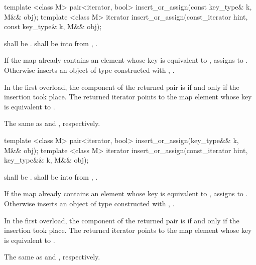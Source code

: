 %
\begin{itemdecl}
template <class M> pair<iterator, bool> insert_or_assign(const key_type& k, M&& obj);
template <class M> iterator insert_or_assign(const_iterator hint, const key_type& k, M&& obj);
\end{itemdecl}

\begin{itemdescr}
\pnum
\requires
{} shall be .
 shall be  into 
from , .

\pnum
\effects
If the map already contains an element 
whose key is equivalent to ,
assigns  to .
Otherwise inserts an object of type 
constructed with , .

\pnum
\returns
In the first overload,
the  component of the returned pair is 
if and only if the insertion took place.
The returned iterator points to the map element
whose key is equivalent to .

\pnum
\complexity
The same as  and ,
respectively.
\end{itemdescr}

%
\begin{itemdecl}
template <class M> pair<iterator, bool> insert_or_assign(key_type&& k, M&& obj);
template <class M> iterator insert_or_assign(const_iterator hint, key_type&& k, M&& obj);
\end{itemdecl}

\begin{itemdescr}
\pnum
\requires
{} shall be .
 shall be  into 
from , .

\pnum
\effects
If the map already contains an element 
whose key is equivalent to ,
assigns  to .
Otherwise inserts an object of type 
constructed with , .

\pnum
\returns
In the first overload,
the  component of the returned pair is 
if and only if the insertion took place.
The returned iterator points to the map element
whose key is equivalent to .

\pnum
\complexity
The same as  and ,
respectively.
\end{itemdescr}

